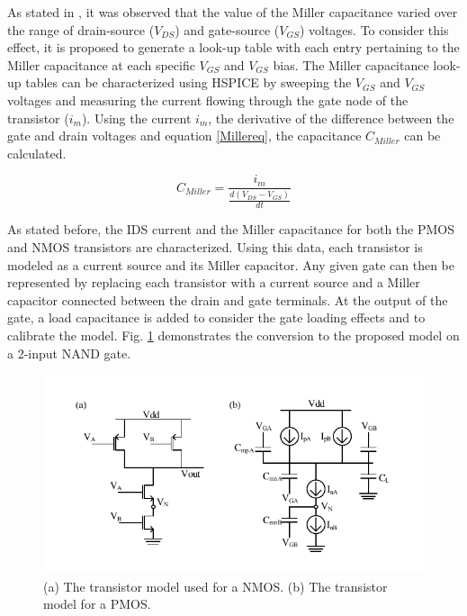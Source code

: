 As stated in \cite{Accurate_Masking}, it was observed that the value of the Miller capacitance varied over the range of drain-source ($V_{DS}$) and gate-source ($V_{GS}$) voltages. To consider this effect, it is proposed to generate a look-up table with each entry pertaining to the Miller capacitance at each specific $V_{GS}$ and $V_{GS}$ bias. The Miller capacitance look-up tables can be characterized using HSPICE by sweeping the $V_{GS}$ and $V_{GS}$ voltages and measuring the current flowing through the gate node of the transistor ($i_m$). Using the current $i_m$, the derivative of the difference between the gate and drain voltages and equation \ref{Millereq}, the capacitance $C_{Miller}$ can be calculated.

\begin{equation}\label{Millereq}
C_{Miller} = \frac{i_m}{\frac{d(V_{DS}-V_{GS})}{dt}}
\end{equation}

As stated before, the IDS current and the Miller capacitance for both the PMOS and NMOS transistors are characterized. Using this data, each transistor is modeled as a current source and its Miller capacitor. Any given gate can then be represented by replacing each transistor with a current source and a Miller capacitor connected between the drain and gate terminals. At the output of the gate, a load capacitance is added to consider the gate loading effects and to calibrate the model. Fig. \ref{Convert} demonstrates the conversion to the proposed model on a 2-input NAND gate.

\begin{figure}[!htbp]
	\centering
	\includegraphics[width=0.85\linewidth]{Figures/Conv_Mod}
	\caption{(a) The transistor model used for a NMOS. (b) The transistor model for a PMOS.}
	\label{Convert}
\end{figure}

